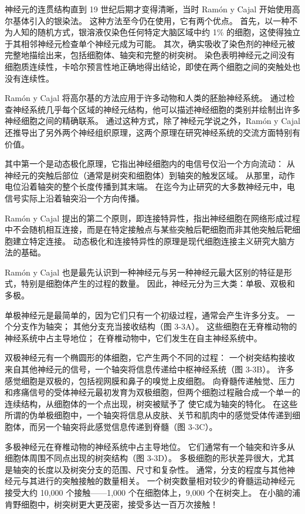 神经元的连贯结构直到 19 世纪后期才变得清晰，当时 Ramón y Cajal 开始使用高尔基体引入的银染法。 
这种方法至今仍在使用，它有两个优点。 
首先，以一种不为人知的随机方式，银溶液仅染色任何特定大脑区域中约 1\% 的细胞，这使得独立于其相邻神经元检查单个神经元成为可能。 
其次，确实吸收了染色剂的神经元被完整地描绘出来，包括细胞体、轴突和完整的树突树。 
染色表明神经元之间没有细胞质连续性，卡哈尔预言性地正确地得出结论，即使在两个细胞之间的突触处也没有连续性。


Ramón y Cajal 将高尔基的方法应用于许多动物和人类的胚胎神经系统。 
通过检查神经系统几乎每个区域的神经元结构，他可以描述神经细胞的类别并绘制出许多神经细胞之间的精确联系。 
通过这种方式，除了神经元学说之外，Ramón y Cajal 还推导出了另外两个神经组织原理，这两个原理在研究神经系统的交流方面特别有价值。


其中第一个是动态极化原理，它指出神经细胞内的电信号仅沿一个方向流动：
从神经元的突触后部位（通常是树突和细胞体）到轴突的触发区域。 
从那里，动作电位沿着轴突的整个长度传播到其末端。 
在迄今为止研究的大多数神经元中，电信号实际上沿着轴突沿一个方向传播。


Ramón y Cajal 提出的第二个原则，即连接特异性，指出神经细胞在网络形成过程中不会随机相互连接，而是在特定接触点与某些突触后靶细胞而非其他突触后靶细胞建立特定连接。 
动态极化和连接特异性的原理是现代细胞连接主义研究大脑方法的基础。


Ramón y Cajal 也是最先认识到一种神经元与另一种神经元最大区别的特征是形式，特别是细胞体产生的过程的数量。 
因此，神经元分为三大类：单极、双极和多极。


单极神经元是最简单的，因为它们只有一个初级过程，通常会产生许多分支。 
一个分支作为轴突； 其他分支充当接收结构（图 3-3A）。 
这些细胞在无脊椎动物的神经系统中占主导地位； 
在脊椎动物中，它们发生在自主神经系统中。


双极神经元有一个椭圆形的体细胞，它产生两个不同的过程：
一个树突结构接收来自其他神经元的信号，一个轴突将信息传递给中枢神经系统（图 3-3B）。 
许多感觉细胞是双极的，包括视网膜和鼻子的嗅觉上皮细胞。 
向脊髓传递触觉、压力和疼痛信号的受体神经元最初发育为双极细胞，但两个细胞过程融合成一个单一的连续结构，从细胞体的一个点出现，树突被赋予了 使它成为轴突的特化。 
在这些所谓的伪单极细胞中，一个轴突将信息从皮肤、关节和肌肉中的感觉受体传递到细胞体，而另一个轴突将此感觉信息传递到脊髓（图 3-3C）。


多极神经元在脊椎动物的神经系统中占主导地位。 
它们通常有一个轴突和许多从细胞体周围不同点出现的树突结构（图 3-3D）。 
多极细胞的形状差异很大，尤其是轴突的长度以及树突分支的范围、尺寸和复杂性。 
通常，分支的程度与其他神经元与其进行的突触接触的数量相关。 
一个树突数量相对较少的脊髓运动神经元接受大约 10,000 个接触——1,000 个在细胞体上，9,000 个在树突上。 
在小脑的浦肯野细胞中，树突树更大更茂密，接受多达一百万次接触！


